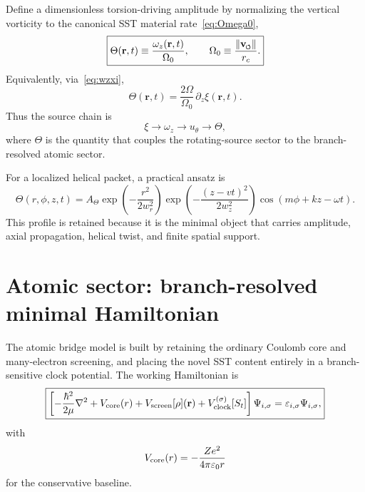 \documentclass[11pt,a4paper]{article}
\newcommand{\swirlarrow}{\mathchoice{\mkern-2mu\scriptstyle\boldsymbol{\circlearrowleft}}{\mkern-2mu\scriptstyle\boldsymbol{\circlearrowleft}}{\mkern-2mu\scriptscriptstyle\boldsymbol{\circlearrowleft}}{\mkern-2mu\scriptscriptstyle\boldsymbol{\circlearrowleft}}}
\newcommand{\vswirl}{\mathbf{v}_{\swirlarrow}}
\newcommand{\rc}{r_c}
\begin{document}
Define a dimensionless torsion-driving amplitude by normalizing the vertical vorticity to the canonical SST material rate~\eqref{eq:Omega0},
\begin{equation}
\label{eq:ThetaDef}
\boxed{
\Theta(\mathbf{r},t) \equiv \frac{\omega_z(\mathbf{r},t)}{\Omega_0},
\qquad
\Omega_0\equiv \frac{\lVert\vswirl\rVert}{\rc}.
}
\end{equation}
Equivalently, via~\eqref{eq:wzxi},
\begin{equation}
\label{eq:ThetaXi}
\boxed{
\Theta(\mathbf{r},t)=\frac{2\Omega}{\Omega_0}\,\partial_z\xi(\mathbf{r},t).
}
\end{equation}
Thus the source chain is
\begin{equation}
\label{eq:source-chain}
\xi \longrightarrow \omega_z \longrightarrow u_\theta \longrightarrow \Theta,
\end{equation}
where $\Theta$ is the quantity that couples the rotating-source sector to the branch-resolved atomic sector.

For a localized helical packet, a practical ansatz is
\begin{equation}
\label{eq:ThetaPacket}
\Theta(r,\phi,z,t)
=
A_\Theta
\exp\!\left(-\frac{r^2}{2w_r^2}\right)
\exp\!\left(-\frac{(z-vt)^2}{2w_z^2}\right)
\cos\!\left(m\phi+kz-\omega t\right).
\end{equation}
This profile is retained because it is the minimal object that carries amplitude, axial propagation, helical twist, and finite spatial support.

\section{Atomic sector: branch-resolved minimal Hamiltonian}
The atomic bridge model is built by retaining the ordinary Coulomb core and many-electron screening, and placing the novel SST content entirely in a branch-sensitive clock potential. The working Hamiltonian is
\begin{equation}
\label{eq:master-H}
\boxed{
\left[
-\frac{\hbar^2}{2\mu}\nabla^2
+V_{\rm core}(r)
+V_{\rm screen}[\rho](\mathbf r)
+V_{\rm clock}^{(\sigma)}[S_t]
\right]\Psi_{i,\sigma}
=\varepsilon_{i,\sigma}\Psi_{i,\sigma},
}
\end{equation}
with
\begin{equation}
\label{eq:Vcore}
V_{\rm core}(r)=-\frac{Ze^2}{4\pi\varepsilon_0 r}
\end{equation}
for the conservative baseline.
\end{document}
